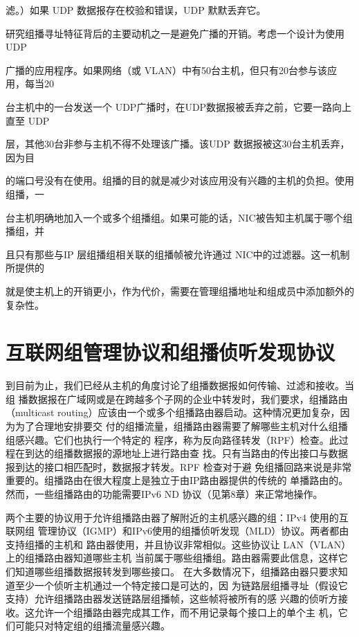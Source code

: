 滤。）如果 UDP 数据报存在校验和错误，UDP 默默丢弃它。

研究组播寻址特征背后的主要动机之一是避免广播的开销。考虑一个设计为使用UDP

广播的应用程序。如果网络（或 VLAN）中有50台主机，但只有20台参与该应用，每当20

台主机中的一台发送一个 UDP广播时，在UDP数据报被丢弃之前，它要一路向上直至 UDP

层，其他30台非参与主机不得不处理该广播。该UDP 数据报被这30台主机丢弃，因为目

的端口号没有在使用。组播的目的就是减少对该应用没有兴趣的主机的负担。使用组播，一

台主机明确地加入一个或多个组播组。如果可能的话，NIC被告知主机属于哪个组播组，并

且只有那些与IP 层组播组相关联的组播帧被允许通过 NIC中的过滤器。这一机制所提供的

就是使主机上的开销更小，作为代价，需要在管理组播地址和组成员中添加额外的复杂性。

\section{互联网组管理协议和组播侦听发现协议}

到目前为止，我们已经从主机的角度讨论了组播数据报如何传输、过滤和接收。当组
播数据报在广域网或是在跨越多个子网的企业中转发时，我们要求，组播路由（multicast
routing）应该由一个或多个组播路由器启动。这种情况更加复杂，因为为了合理地安排要交
付的组播流量，组播路由器需要了解哪些主机对什么组播组感兴趣。它们也执行一个特定的
程序，称为反向路径转发（RPF）检查。此过程在到达的组播数据报的源地址上进行路由查
找。只有当路由的传出接口与数据报到达的接口相匹配时，数据报才转发。RPF 检查对于避
免组播回路来说是非常重要的。组播路由在很大程度上是独立于由IP路由器提供的传统的
单播路由的。然而，一些组播路由的功能需要IPv6 ND 协议（见第8章）来正常地操作。

两个主要的协议用于允许组播路由器了解附近的主机感兴趣的组：IPv4 使用的互联网组
管理协议（IGMP）和IPv6使用的组播侦听发现（MLD）协议。两者都由支持组播的主机和
路由器使用，并且协议非常相似。这些协议让 LAN（VLAN）上的组播路由器知道哪些主机
当前属于哪些组播组。路由器需要此信息，这样它们知道哪些组播数据报转发到哪些接口。
在大多数情况下，组播路由器只要求知道至少一个侦听主机通过一个特定接口是可达的，因
为链路层组播寻址（假设它支持）允许组播路由器发送链路层组播帧，这些帧将被所有的感
兴趣的侦听方接收。这允许一个组播路由器完成其工作，而不用记录每个接口上的单个主
机，它们可能只对特定组的组播流量感兴趣。

